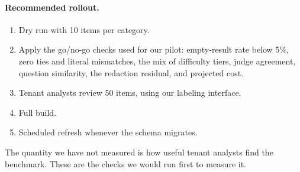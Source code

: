 \paragraph{Recommended rollout.}
\begin{enumerate}
\item Dry run with 10 items per category.
\item Apply the go/no-go checks used for our pilot: empty-result rate below 5\%, zero ties and literal mismatches, the mix of difficulty tiers, judge agreement, question similarity, the redaction residual, and projected cost.
\item Tenant analysts review 50 items, using our labeling interface.
\item Full build.
\item Scheduled refresh whenever the schema migrates.
\end{enumerate}
The quantity we have not measured is how useful tenant analysts find the benchmark. These are the checks we would run first to measure it.
